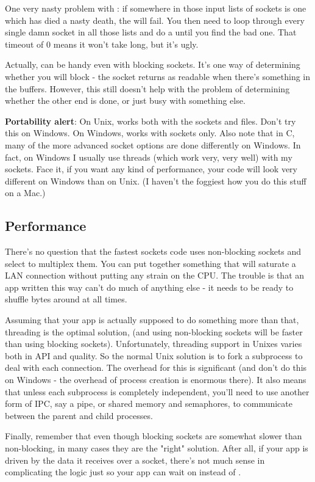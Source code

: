 \documentclass{howto}
\begin{document}
One very nasty problem with : if somewhere in those
input lists of sockets is one which has died a nasty death, the
 will fail. You then need to loop through every
single damn socket in all those lists and do a
 until you find the bad one. That
timeout of 0 means it won't take long, but it's ugly.

Actually,  can be handy even with blocking sockets.
It's one way of determining whether you will block - the socket
returns as readable when there's something in the buffers.  However,
this still doesn't help with the problem of determining whether the
other end is done, or just busy with something else.

\textbf{Portability alert}: On Unix,  works both with
the sockets and files. Don't try this on Windows. On Windows,
 works with sockets only. Also note that in C, many
of the more advanced socket options are done differently on
Windows. In fact, on Windows I usually use threads (which work very,
very well) with my sockets. Face it, if you want any kind of
performance, your code will look very different on Windows than on
Unix. (I haven't the foggiest how you do this stuff on a Mac.)

\subsection{Performance}

There's no question that the fastest sockets code uses non-blocking
sockets and select to multiplex them. You can put together something
that will saturate a LAN connection without putting any strain on the
CPU. The trouble is that an app written this way can't do much of
anything else - it needs to be ready to shuffle bytes around at all
times.

Assuming that your app is actually supposed to do something more than
that, threading is the optimal solution, (and using non-blocking
sockets will be faster than using blocking sockets). Unfortunately,
threading support in Unixes varies both in API and quality. So the
normal Unix solution is to fork a subprocess to deal with each
connection. The overhead for this is significant (and don't do this on
Windows - the overhead of process creation is enormous there). It also
means that unless each subprocess is completely independent, you'll
need to use another form of IPC, say a pipe, or shared memory and
semaphores, to communicate between the parent and child processes.

Finally, remember that even though blocking sockets are somewhat
slower than non-blocking, in many cases they are the "right"
solution. After all, if your app is driven by the data it receives
over a socket, there's not much sense in complicating the logic just
so your app can wait on  instead of
.
\end{document}
